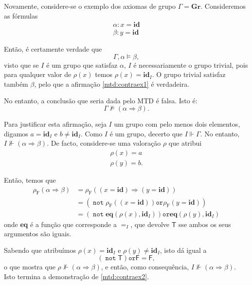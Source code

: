 \documentclass{report}
\theoremstyle{definition}
\theoremstyle{remark}
\newcommand{\F}{\mathrm{F}}
\newcommand{\lt}{\mathsf{T}}
\newcommand{\lf}{\mathsf{F}}
\DeclareMathOperator{\pnot}{\texttt{not}}
\newcommand{\por}{\mathbin{\texttt{or}}}
\newcommand{\imply}{\mathbin{\Rightarrow}}
\begin{document}
	Novamente, considere-se o exemplo dos axiomas de grupo $\Gamma = \textbf{Gr}$. Consideremos as fórmulas
	\begin{gather*}
	\alpha : x = \mathbf{id}\\
	\beta : y = \mathbf{id}
	\end{gather*}
	
	Então, é certamente verdade que
	\begin{equation}\label{mtd:contraex1}
	\Gamma, \alpha \vDash \beta,
	\end{equation}
	visto que se $I$ é um grupo que satisfaz $\alpha$, $I$ é necessariamente o grupo trivial, pois para qualquer valor de $\rho(x)$ temos $\rho(x) = \mathbf{id}_I$. O grupo trivial satisfaz também $\beta$, pelo que a afirmação \eqref{mtd:contraex1} é verdadeira.
	
	No entanto, a conclusão que seria dada pelo MTD é falsa. Isto é:
	\begin{equation}\label{mtd:contraex2}
	\Gamma \nvDash (\alpha \imply \beta).
	\end{equation}
	
	Para justificar esta afirmação, seja $I$ um grupo com pelo menos dois elementos, digamos $a = \mathbf{id}_I$ e $b \neq \mathbf{id}_I$. Como $I$ é um grupo, decerto que $I \Vdash \Gamma$. No entanto, $I \nVdash (\alpha \imply \beta)$. De facto, considere-se uma valoração $\rho$ que atribui
	\begin{gather*}
	\rho(x) = a\\
	\rho(y) = b.
	\end{gather*}
	
	Então, temos que
	\begin{align*}
	\rho_\F(\alpha \imply \beta) &= \rho_\F((x = \mathbf{id}) \imply (y = \mathbf{id}))\\
	&= (\pnot \rho_\F((x = \mathbf{id})) \por \rho_\F(y = \mathbf{id}))\\
	&= (\pnot \mathbf{eq}(\rho(x), \mathbf{id}_I)) \por \mathbf{eq}(\rho(y), \mathbf{id}_I)
	\end{align*}
	onde \textbf{eq} é a função que corresponde a $=_I$, que devolve $\lt$ sse ambos os seus argumentos são iguais.
	
	Sabendo que atribuímos $\rho(x) = \mathbf{id}_I$ e $\rho(y) \neq \mathbf{id}_I$, isto dá igual a
	\[(\pnot \lt) \por \lf = \lf,\]
	o que mostra que $\rho \nVdash (\alpha \imply \beta)$, e então, como consequência, $I \nVdash (\alpha \imply \beta)$. Isto termina a demonstração de \eqref{mtd:contraex2}.
	
\end{document}
